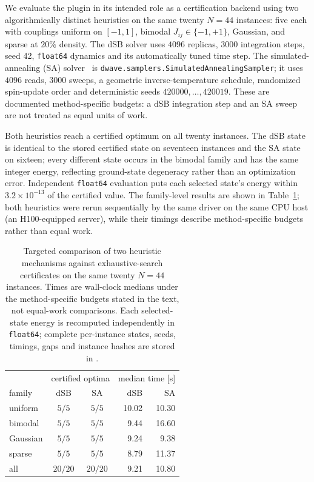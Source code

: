 \documentclass[preprint,12pt,a4paper]{elsarticle}
\begin{document}
We evaluate the plugin in its intended role as a certification backend using two
algorithmically distinct heuristics on the same twenty $N=44$ instances: five each with
couplings uniform on $[-1,1]$, bimodal $J_{ij}\in\{-1,+1\}$, Gaussian, and sparse at $20\%$
density. The dSB solver uses $4096$ replicas, $3000$ integration steps, seed 42,
\texttt{float64} dynamics and its automatically tuned time step. The simulated-annealing (SA)
solver~\cite{kirkpatrick1983optimization} is
\texttt{dwave.samplers.SimulatedAnnealingSampler}; it uses $4096$ reads, $3000$ sweeps, a
geometric inverse-temperature schedule, randomized spin-update order and deterministic seeds
$420000,\dots,420019$. These are documented method-specific budgets: a dSB integration step
and an SA sweep are not treated as equal units of work.

Both heuristics reach a certified optimum on all twenty instances. The dSB state is identical
to the stored certified state on seventeen instances and the SA state on sixteen; every
different state occurs in the bimodal family and has the same integer energy, reflecting
ground-state degeneracy rather than an optimization error. Independent \texttt{float64}
evaluation puts each selected state's energy within $3.2\times10^{-13}$ of the certified value.
The family-level results are shown in Table~\ref{tab:multisolver}; both heuristics were rerun
sequentially by the same driver on the same CPU host (an H100-equipped server),
while their timings describe method-specific budgets rather than equal work.

\begin{table}[H]
\centering
\small
\begin{tabular}{|l|cc|rr|}
\hline
 & \multicolumn{2}{c|}{certified optima} & \multicolumn{2}{c|}{median time [s]} \\
family & dSB & SA & dSB & SA \\
\hline
uniform  & $5/5$ & $5/5$ & 10.02 & 10.30 \\
bimodal  & $5/5$ & $5/5$ &  9.44 & 16.60 \\
Gaussian & $5/5$ & $5/5$ &  9.24 &  9.38 \\
sparse   & $5/5$ & $5/5$ &  8.79 & 11.37 \\
\hline
all      & $20/20$ & $20/20$ &  9.21 & 10.80 \\
\hline
\end{tabular}
\caption{Targeted comparison of two heuristic mechanisms against exhaustive-search
certificates on the same twenty $N=44$ instances. Times are wall-clock medians under the
method-specific budgets stated in the text, not equal-work comparisons. Each selected-state
energy is recomputed independently in \texttt{float64}; complete per-instance states,
seeds, timings, gaps and instance hashes are stored in
\protect{}.}
\label{tab:multisolver}
\end{table}
\end{document}
